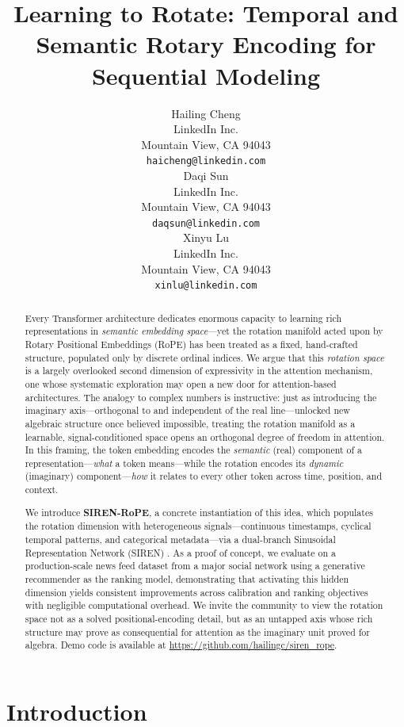 \documentclass{article}
\title{Learning to Rotate: Temporal and Semantic Rotary Encoding for Sequential Modeling}
\author{%
  Hailing Cheng \\
  LinkedIn Inc.\\
  Mountain View, CA 94043 \\
  \texttt{haicheng@linkedin.com} \\
  \And
  Daqi Sun \\
  LinkedIn Inc.\\
  Mountain View, CA 94043 \\
  \texttt{daqsun@linkedin.com} \\
  \And
  Xinyu Lu \\
  LinkedIn Inc.\\
  Mountain View, CA 94043 \\
  \texttt{xinlu@linkedin.com} \\
}
\begin{document}
\maketitle

\begin{abstract}
Every Transformer architecture dedicates enormous capacity to learning rich representations in \emph{semantic embedding space}---yet the rotation manifold acted upon by Rotary Positional Embeddings (RoPE) has been treated as a fixed, hand-crafted structure, populated only by discrete ordinal indices. We argue that this \emph{rotation space} is a largely overlooked second dimension of expressivity in the attention mechanism, one whose systematic exploration may open a new door for attention-based architectures. The analogy to complex numbers is instructive: just as introducing the imaginary axis---orthogonal to and independent of the real line---unlocked new algebraic structure once believed impossible, treating the rotation manifold as a learnable, signal-conditioned space opens an orthogonal degree of freedom in attention. In this framing, the token embedding encodes the \emph{semantic} (real) component of a representation---\emph{what} a token means---while the rotation encodes its \emph{dynamic} (imaginary) component---\emph{how} it relates to every other token across time, position, and context.

We introduce \textbf{SIREN-RoPE}, a concrete instantiation of this idea, which populates the rotation dimension with heterogeneous signals---continuous timestamps, cyclical temporal patterns, and categorical metadata---via a dual-branch Sinusoidal Representation Network (SIREN) \citep{sitzmann2020siren}. As a proof of concept, we evaluate on a production-scale news feed dataset from a major social network using a generative recommender as the ranking model, demonstrating that activating this hidden dimension yields consistent improvements across calibration and ranking objectives with negligible computational overhead. We invite the community to view the rotation space not as a solved positional-encoding detail, but as an untapped axis whose rich structure may prove as consequential for attention as the imaginary unit proved for algebra.
Demo code is available at \url{https://github.com/hailingc/siren_rope}.
\end{abstract}


\section{Introduction}
\label{sec:intro}
\end{document}
